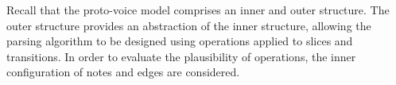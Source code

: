 \documentclass[12pt,a4paper,twoside,openany]{report} \usepackage[pdfborder={0 0 0}]{hyperref}    %
\theoremstyle{definition} \newtheorem{definition}{Definition}[section]
\begin{document}
%
%





  Recall that the proto-voice model comprises an inner and outer structure. The outer structure provides an abstraction
  of the inner structure, allowing the parsing algorithm to be designed using operations applied to slices and
  transitions. In order to evaluate the plausibility of operations, the inner configuration of notes and edges are considered.
\end{document}

